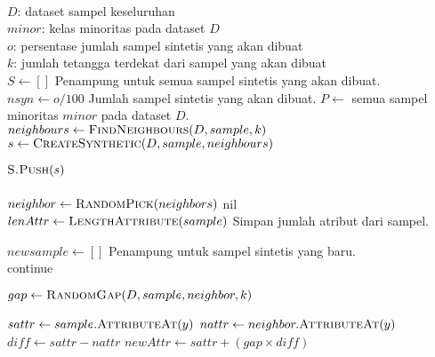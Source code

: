 \begin{center}
	\label{alg:lnsmote}
	\begin{algorithmic}[1]
\Require \\
$ D $: dataset sampel keseluruhan \\
$ minor $: kelas minoritas pada dataset $D$ \\
$ o $: persentase jumlah sampel sintetis yang akan dibuat \\
$ k $: jumlah tetangga terdekat dari sampel yang akan dibuat
\\
	\State $ S \gets [] $
	\Comment Penampung untuk semua sampel sintetis yang akan dibuat.
	\State $ nsyn \gets o/100 $
	\Comment Jumlah sampel sintetis yang akan dibuat.
	\State $ P \gets $ semua sampel minoritas $minor$ pada dataset $D$.
	\\
	\newpage
		\State $ neighbours \gets \Call{FindNeighbours}{D, sample, k} $
			\State $ s \gets \Call{CreateSynthetic}{D, sample, neighbours} $

				\State $ \Call{S.Push}{s} $
			\EndIf
		\EndFor
	\EndFor
	\\
	\State {}
\EndFunction
\\
	\State $ neighbor \gets \Call{RandomPick}{neighbors} $
		\State \Return nil
	\EndIf
	\\
	\State $ lenAttr \gets \Call{LengthAttribute}{sample} $
	\Comment Simpan jumlah atribut dari sampel.

	\State $ newsample \gets [] $
	\Comment Penampung untuk sampel sintetis yang baru.
	\\
			\State continue
		\EndIf

		\State $ gap \gets \Call{RandomGap}{D, sample, neighbor, k} $

		\State $ sattr \gets sample.\Call{AttributeAt}{y} $
		\State $ nattr \gets neighbor.\Call{AttributeAt}{y} $
		\State $ diff \gets sattr - nattr $
		\State $ newAttr \gets sattr + (gap \times diff) $


\end{algorithmic}
\end{center}
